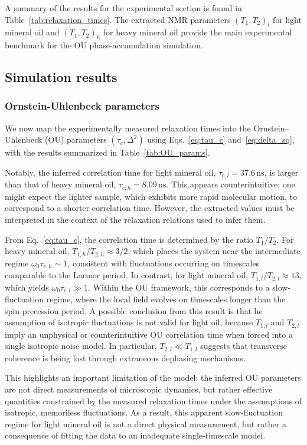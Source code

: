 \documentclass[%
 reprint,
 amsmath,amssymb,
 aps,
]{revtex4-2}
\begin{document}
A summary of the results for the experimental section is found in Table~\ref{tab:relaxation_times}. The extracted NMR parameters $(T_1,T_2)_l$ for light mineral oil and $(T_1,T_2)_h$ for heavy mineral oil provide the main experimental benchmark for the OU phase-accumulation simulation.

\subsection{Simulation results}
\label{sec:simulation_results}

\subsubsection{Ornstein-Uhlenbeck parameters}
\label{sec:OU_params}
We now map the experimentally measured relaxation times into the Ornstein--Uhlenbeck (OU) parameters $(\tau_c,\Delta^2)$ using Eqs.~\ref{eq:tau_c} and~\ref{eq:delta_sq}, with the results summarized in Table~\ref{tab:OU_params}. 

Notably, the inferred correlation time for light mineral oil, $\tau_{c,l} = 37.6\,\mathrm{ns}$, is larger than that of heavy mineral oil, $\tau_{c,h} = 8.09\,\mathrm{ns}$. This appears counterintuitive: one might expect the lighter sample, which exhibits more rapid molecular motion, to correspond to a shorter correlation time. However, the extracted values must be interpreted in the context of the relaxation relations used to infer them.

From Eq.~\ref{eq:tau_c}, the correlation time is determined by the ratio $T_1/T_2$. For heavy mineral oil, $T_{1,h}/T_{2,h} \approx 3/2$, which places the system near the intermediate regime $\omega_0 \tau_{c,h} \sim 1$, consistent with fluctuations occurring on timescales comparable to the Larmor period. In contrast, for light mineral oil, $T_{1,l}/T_{2,l} \approx 13$, which yields $\omega_0 \tau_{c,l} \gg 1$. Within the OU framework, this corresponds to a slow-fluctuation regime, where the local field evolves on timescales longer than the spin precession period. A possible conclusion from this result is that he assumption of isotropic fluctuations is not valid for light oil, because $T_{1,l}$ and $T_{2,l}$ imply an unphysical or counterintuitive OU correlation time when forced into a single isotropic noise model. In particular, $T_{2,l} \ll T_{1,l}$ suggests that transverse coherence is being lost through extraneous dephasing mechanisms.

This highlights an important limitation of the model: the inferred OU parameters are not direct measurements of microscopic dynamics, but rather effective quantities constrained by the measured relaxation times under the assumptions of isotropic, memoriless fluctuations. As a result, this apparent slow-fluctuation regime for light mineral oil is not a direct physical measurement, but rather a consequence of fitting the data to an inadequate single-timescale model.
\end{document}
